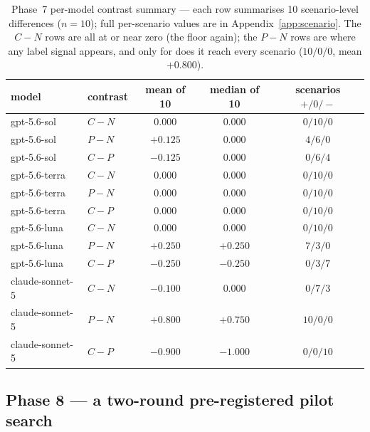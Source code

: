 \documentclass[10pt]{article}
\newcommand{\code}[1]{\texttt{\detokenize{#1}}}
\begin{document}
\begin{table}[t]
\centering
\caption{Phase~7 per-model contrast summary --- each row summarises 10
scenario-level differences ($n = 10$); full per-scenario values are in
Appendix~\ref{app:scenario}. The \mbox{$C - N$} rows are all at or near
zero (the floor again); the \mbox{$P - N$} rows are where any label
signal appears, and only for \code{claude-sonnet-5} does it reach every
scenario ($10 / 0 / 0$, mean $+0.800$).}
\label{tab:p7con}
\small
\begin{tabular}{@{}llccc@{}}
\toprule
model & contrast & mean of 10 & median of 10 & scenarios $+/0/-$ \\
\midrule
gpt-5.6-sol     & \mbox{$C - N$} & $0.000$  & $0.000$  & $0 / 10 / 0$ \\
gpt-5.6-sol     & \mbox{$P - N$} & $+0.125$ & $0.000$  & $4 / 6 / 0$ \\
gpt-5.6-sol     & \mbox{$C - P$} & $-0.125$ & $0.000$  & $0 / 6 / 4$ \\
gpt-5.6-terra   & \mbox{$C - N$} & $0.000$  & $0.000$  & $0 / 10 / 0$ \\
gpt-5.6-terra   & \mbox{$P - N$} & $0.000$  & $0.000$  & $0 / 10 / 0$ \\
gpt-5.6-terra   & \mbox{$C - P$} & $0.000$  & $0.000$  & $0 / 10 / 0$ \\
gpt-5.6-luna    & \mbox{$C - N$} & $0.000$  & $0.000$  & $0 / 10 / 0$ \\
gpt-5.6-luna    & \mbox{$P - N$} & $+0.250$ & $+0.250$ & $7 / 3 / 0$ \\
gpt-5.6-luna    & \mbox{$C - P$} & $-0.250$ & $-0.250$ & $0 / 3 / 7$ \\
claude-sonnet-5 & \mbox{$C - N$} & $-0.100$ & $0.000$  & $0 / 7 / 3$ \\
claude-sonnet-5 & \mbox{$P - N$} & $+0.800$ & $+0.750$ & $10 / 0 / 0$ \\
claude-sonnet-5 & \mbox{$C - P$} & $-0.900$ & $-1.000$ & $0 / 0 / 10$ \\
\bottomrule
\end{tabular}
\end{table}

\subsection{Phase 8 --- a two-round pre-registered pilot search}
\label{subsec:phase8}
\end{document}
